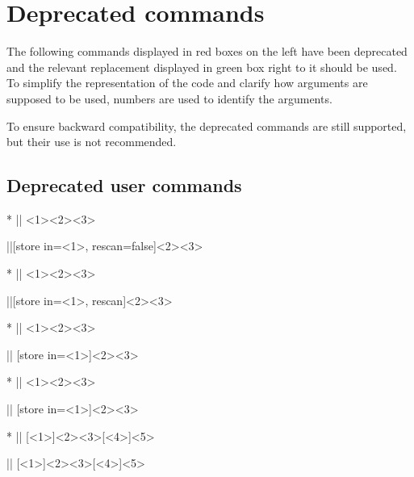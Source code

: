 \documentclass[a4paper]{article}
\begin{document}
{{\section{Deprecated commands}

The following commands displayed in red boxes on the left have been deprecated and the relevant replacement displayed in green box right to it should be used. To simplify the representation of the code and clarify how arguments are supposed to be used, numbers are used to identify the arguments.

To ensure backward compatibility, the deprecated commands are still supported, but their use is not recommended.

\subsection{Deprecated user commands}

\begin{macrodeprecated}*
|\JSONParseSetValue|
  {<1>}{<2>}{<3>}
\end{macrodeprecated}
\hfill
\begin{macroreplacement}
|\JSONParseValue|[store in={<1>},
  rescan=false]{<2>}{<3>}
\end{macroreplacement}

\begin{macrodeprecated}*
|\JSONParseSetRescanValue|
  {<1>}{<2>}{<3>}
\end{macrodeprecated}
\hfill
\begin{macroreplacement}
|\JSONParseValue|[store in={<1>},
  rescan]{<2>}{<3>}
\end{macroreplacement}

\begin{macrodeprecated}*
|\JSONParseSetKeys|
  {<1>}{<2>}{<3>}
\end{macrodeprecated}
\hfill
\begin{macroreplacement}
|\JSONParseKeys|
  [store in={<1>}]{<2>}{<3>}
\end{macroreplacement}

\begin{macrodeprecated}*
|\JSONParseSetArrayCount|
  {<1>}{<2>}{<3>}
\end{macrodeprecated}
\hfill
\begin{macroreplacement}
|\JSONParseArrayCount|
  [store in={<1>}]{<2>}{<3>}
\end{macroreplacement}

\begin{macrodeprecated}*
|\JSONParseArrayValues|
  [<1>]{<2>}{<3>}[<4>]{<5>}
\end{macrodeprecated}
\hfill
\begin{macroreplacement}
|\JSONParseArrayUse|
  [<1>]{<2>}{<3>}[<4>]{<5>}
\end{macroreplacement}

}}
\end{document}
